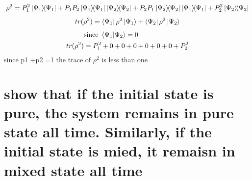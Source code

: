 \documentclass{article}
\newcommand{\nm}{\begin{equation}}
\newcommand{\enm}{\end{equation}}
\begin{document}
\nm
\rho^2=P_1^2\op{\Psi_1}{\Psi_1}+P_1P_2\op{\Psi_1}{\Psi_1}\op{\Psi_2}{\Psi_2}+P_2P_1\op{\Psi_2}{\Psi_2}\op{\Psi_1}{\Psi_1}+P_2^2\op{\Psi_2}{\Psi_2}
\enm
\nm
tr(\rho^2)= \bra{\Psi_1}\rho^2\ket{\Psi_1}+\bra{\Psi_2}\rho^2\ket{\Psi_2}
\enm
\begin{align*}
&\text{since } \ip{\Psi_1}{\Psi_2}=0\\
tr(\rho^2)&=P_1^2+0+0+0 +0+0+0+P_2^2\\
\end{align*}
since p1 +p2 =1 the trace of $\rho^2$ is less than one

\section{show that if the initial state is pure, the system remains in pure state all time. Similarly, if the initial state is mied, it remaisn in mixed state all time}
\end{document}
